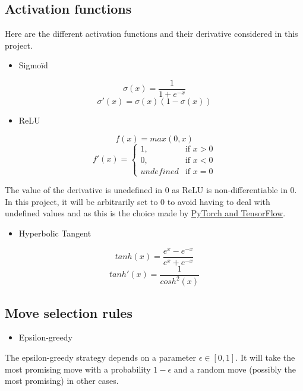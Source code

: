 \documentclass{article}
\begin{document}
\subsection{Activation functions}

Here are the different activation functions and their derivative considered in this project.

\begin{itemize}
    \item Sigmoïd
\end{itemize}

$$ \sigma(x) =  \frac{1}{1 + e^{-x}}  $$ 
$$ \sigma'(x) =  \sigma(x)(1 - \sigma(x))  $$ 

\begin{itemize}
    \item ReLU
\end{itemize}

$$ f(x) =  max(0, x)  $$ 
\[
    f'(x)= 
\begin{cases}
    1,         & \text{if } x > 0\\
    0,         & \text{if } x < 0\\
    undefined & \text{if } x = 0
\end{cases}
\]

The value of the derivative is unedefined in $0$ as ReLU is non-differentiable in $0$. In this project, it will be arbitrarily set to 0 to avoid having to deal with undefined values and as this is the choice made by \href{https://hal.archives-ouvertes.fr/hal-03265059v2/document\#:~:text=The\%20value\%20of\%20the\%20derivative,the\%20subgradient\%20from\%20convex\%20analysis}{PyTorch and TensorFlow}.

\begin{itemize}
    \item Hyperbolic Tangent
\end{itemize}

$$ tanh(x) =  \frac{e^{x} - e^{-x}}{e^{x} + e^{-x}}  $$ 
$$ tanh'(x) = \frac{1}{cosh^{2}(x)}  $$ 

\subsection{Move selection rules}

\begin{itemize}
    \item Epsilon-greedy
\end{itemize}

The epsilon-greedy strategy depends on a parameter $\epsilon \in [0, 1]$. It will take the most promising move with a probability $1 - \epsilon$ and a random move (possibly the most promising) in other cases.
\end{document}
